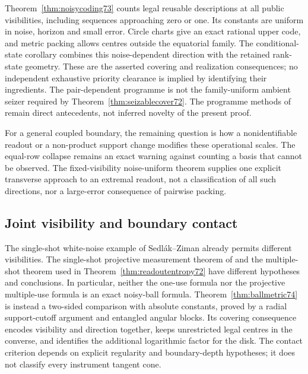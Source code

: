 Theorem~\ref{thm:noisycoding73} counts legal reusable descriptions at
all public visibilities, including sequences approaching zero or one.
Its constants are uniform in noise, horizon and small error. Circle
charts give an exact rational upper code, and metric packing allows
centres outside the equatorial family. The conditional-state corollary
combines this noise-dependent direction with the retained rank-state
geometry. These are the asserted covering and realization consequences;
no independent exhaustive priority clearance is implied by identifying
their ingredients. The pair-dependent programme is not the
family-uniform ambient seizer required by
Theorem~\ref{thm:seizablecover72}. The programme methods of
\cite{DW72,WBHK72,WW72} remain direct antecedents, not inferred
novelty of the present proof.

For a general coupled boundary, the remaining question is how a
nonidentifiable readout or a non-product support change modifies these
operational scales. The equal-row collapse remains an exact warning
against counting a basis that cannot be observed. The fixed-visibility
noise-uniform theorem supplies one explicit transverse approach to an
extremal readout, not a classification of all such directions, nor a
large-error consequence of pairwise packing.

\subsection{Joint visibility and boundary contact}
The single-shot white-noise example of Sedl\'ak--Ziman \cite{SZ74}
already permits different visibilities. The single-shot projective
measurement theorem of \cite{PPKK74} and the multiple-shot theorem
used in Theorem~\ref{thm:readoutentropy72} have different hypotheses and
conclusions. In particular, neither the one-use formula nor the
projective multiple-use formula is an exact noisy-ball formula.
Theorem~\ref{thm:ballmetric74} is instead a two-sided comparison with
absolute constants, proved by a radial support-cutoff argument and
entangled angular blocks. Its covering consequence encodes visibility
and direction together, keeps unrestricted legal centres in the converse, and
identifies the additional logarithmic factor for the disk.
The contact criterion depends on explicit regularity and boundary-depth
hypotheses; it does not classify every instrument tangent cone.

